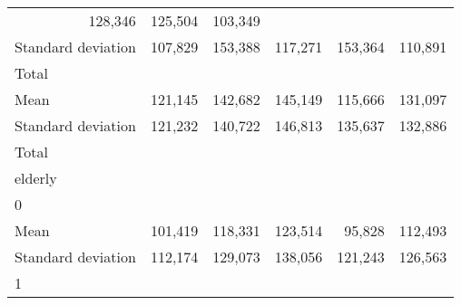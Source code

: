 \begin{tabular}{llllll}
  \multicolumn{1}{r}{128,346} &
  \multicolumn{1}{r}{125,504} &
  \multicolumn{1}{r}{103,349} \\
\multicolumn{1}{l}{\hspace{4em}Standard deviation} &
  \multicolumn{1}{|r}{107,829} &
  \multicolumn{1}{r}{153,388} &
  \multicolumn{1}{r}{117,271} &
  \multicolumn{1}{r}{153,364} &
  \multicolumn{1}{r}{110,891} \\
\multicolumn{1}{l}{\hspace{3em}Total} &
  \multicolumn{1}{|r}{} &
  \multicolumn{1}{r}{} &
  \multicolumn{1}{r}{} &
  \multicolumn{1}{r}{} &
  \multicolumn{1}{r}{} \\
\multicolumn{1}{l}{\hspace{4em}Mean} &
  \multicolumn{1}{|r}{121,145} &
  \multicolumn{1}{r}{142,682} &
  \multicolumn{1}{r}{145,149} &
  \multicolumn{1}{r}{115,666} &
  \multicolumn{1}{r}{131,097} \\
\multicolumn{1}{l}{\hspace{4em}Standard deviation} &
  \multicolumn{1}{|r}{121,232} &
  \multicolumn{1}{r}{140,722} &
  \multicolumn{1}{r}{146,813} &
  \multicolumn{1}{r}{135,637} &
  \multicolumn{1}{r}{132,886} \\
\multicolumn{1}{l}{\hspace{1em}Total} &
  \multicolumn{1}{|r}{} &
  \multicolumn{1}{r}{} &
  \multicolumn{1}{r}{} &
  \multicolumn{1}{r}{} &
  \multicolumn{1}{r}{} \\
\multicolumn{1}{l}{\hspace{2em}elderly} &
  \multicolumn{1}{|r}{} &
  \multicolumn{1}{r}{} &
  \multicolumn{1}{r}{} &
  \multicolumn{1}{r}{} &
  \multicolumn{1}{r}{} \\
\multicolumn{1}{l}{\hspace{3em}0} &
  \multicolumn{1}{|r}{} &
  \multicolumn{1}{r}{} &
  \multicolumn{1}{r}{} &
  \multicolumn{1}{r}{} &
  \multicolumn{1}{r}{} \\
\multicolumn{1}{l}{\hspace{4em}Mean} &
  \multicolumn{1}{|r}{101,419} &
  \multicolumn{1}{r}{118,331} &
  \multicolumn{1}{r}{123,514} &
  \multicolumn{1}{r}{95,828} &
  \multicolumn{1}{r}{112,493} \\
\multicolumn{1}{l}{\hspace{4em}Standard deviation} &
  \multicolumn{1}{|r}{112,174} &
  \multicolumn{1}{r}{129,073} &
  \multicolumn{1}{r}{138,056} &
  \multicolumn{1}{r}{121,243} &
  \multicolumn{1}{r}{126,563} \\
\multicolumn{1}{l}{\hspace{3em}1} &

\end{tabular}
